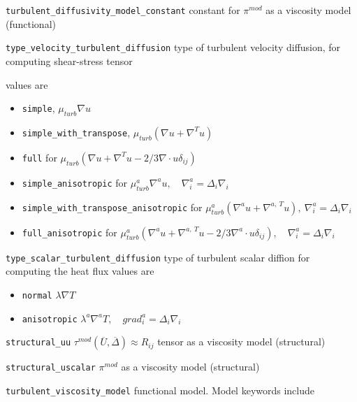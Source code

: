 \texttt{turbulent\_diffusivity\_model\_constant} constant for $\pi^{mod}$ as a viscosity model (functional)

\texttt{type\_velocity\_turbulent\_diffusion} type of turbulent velocity diffusion, for computing shear-stress tensor

values are 
\begin{itemize}
    \item \texttt{simple}, $\mu_{turb}\nabla u$
    \item \texttt{simple\_with\_transpose}, $\mu_{turb}(\nabla u + \nabla^T u)$
    \item \texttt{full} for $\mu_{turb}(\nabla u + \nabla^T u - 2/3 \nabla \cdot u \delta_{ij})$
    \item \texttt{simple\_anisotropic} for $\mu_{turb}^a \nabla^a u, \quad \nabla^a_i = \Delta_i \nabla_i$
    \item \texttt{simple\_with\_transpose\_anisotropic} for $\mu_{turb}^a (\nabla^a u + \nabla^{a,\ T} u), \ \nabla^a_i = \Delta_i \nabla_i$
    \item \texttt{full\_anisotropic} for $\mu_{turb}^a (\nabla^a u + \nabla^{a,\ T} u - 2/3 \nabla^a \cdot u \delta_{ij} ), \quad \nabla^a_i = \Delta_i \nabla_i$
\end{itemize}



\texttt{type\_scalar\_turbulent\_diffusion} type of turbulent scalar diffion for computing the heat flux
values are 
\begin{itemize}
    \item \texttt{normal} $\lambda \nabla T$
    \item \texttt{anisotropic} $\lambda ^a \nabla ^a T, \quad grad^a_i=\Delta_i \nabla_i$
\end{itemize}

\texttt{structural\_uu} $\tau^{mod}(\overline{U}, \overline{\Delta}) \approx R_{ij}$ tensor as a viscosity model (structural)


\texttt{structural\_uscalar} $\pi^{mod}$ as a viscosity model (structural)

\texttt{turbulent\_viscosity\_model} functional model. Model keywords include

